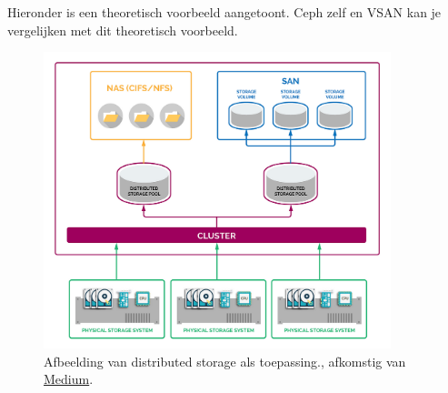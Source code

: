 Hieronder is een theoretisch voorbeeld aangetoont. Ceph zelf en VSAN kan je vergelijken met dit theoretisch voorbeeld.
\begin{figure}[h!]
  \centering
  \includegraphics[width=0.9\textwidth]{../onderzoek/dssep.png} 
  \caption{Afbeelding van distributed storage als toepassing., afkomstig van \href{https://medium.com/systemdesign-us-blog/how-does-storage-work-in-distributed-systems-fde890e88a7f}{Medium}.}
  \label{fig:das}
\end{figure}